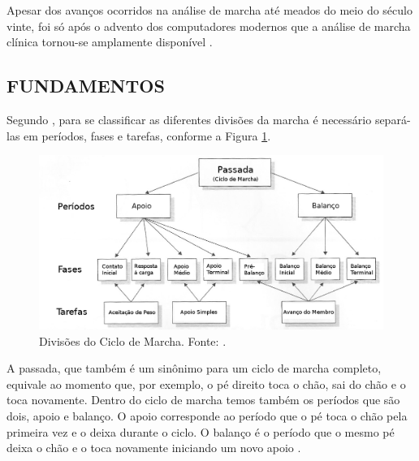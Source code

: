 Apesar dos avanços ocorridos na análise de marcha até meados do meio do século vinte, foi só após o advento dos computadores modernos que a análise de marcha clínica tornou-se amplamente disponível \cite{Baker2007}.



\subsection{FUNDAMENTOS}
Segundo , para se classificar as diferentes divisões da marcha é necessário separá-las em períodos, fases e tarefas, conforme a Figura \ref{fases_marcha}.

\begin{figure}[ht]
	\centering
	\includegraphics[width=15cm]{figuras/fases_marcha.eps}
	\caption{Divisões do Ciclo de Marcha. Fonte: .}
	\label{fases_marcha}
\end{figure}

A passada, que também é um sinônimo para um ciclo de marcha completo, equivale ao momento que, por exemplo, o pé direito toca o chão, sai do chão e o toca novamente. Dentro do ciclo de marcha temos também os períodos que são dois, apoio e balanço. 
O apoio corresponde ao período que o pé toca o chão pela primeira vez e o deixa durante o ciclo. 
O balanço é o período que o mesmo pé deixa o chão e o toca novamente iniciando um novo apoio \cite{Perry2010}. 

